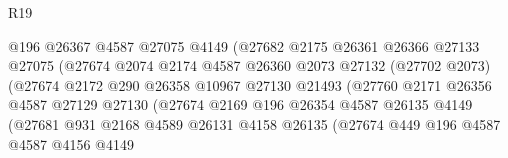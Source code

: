 \begin{lexlean}{R19}
\begin{coremodule}
                                    @196
                                    @26367
                                    @4587
                                    @27075
                                    @4149
                                    (@27682
                                      @2175
                                      @26361
                                      @26366
                                      @27133
                                      @27075
                                      (@27674
                                        @2074
                                        @2174
                                        @4587
                                        @26360
                                        @2073
                                        @27132
                                        (@27702 @2073)
                                        (@27674
                                          @2172
                                          @290
                                          @26358
                                          @10967
                                          @27130
                                          @21493
                                          (@27760
                                            @2171
                                            @26356
                                            @4587
                                            @27129
                                            @27130
                                            (@27674
                                              @2169
                                              @196
                                              @26354
                                              @4587
                                              @26135
                                              @4149
                                              (@27681
                                                @931
                                                @2168
                                                @4589
                                                @26131
                                                @4158
                                                @26135
                                                (@27674
                                                  @449
                                                  @196
                                                  @4587
                                                  @4587
                                                  @4156
                                                  @4149

\end{coremodule}
\end{lexlean}
